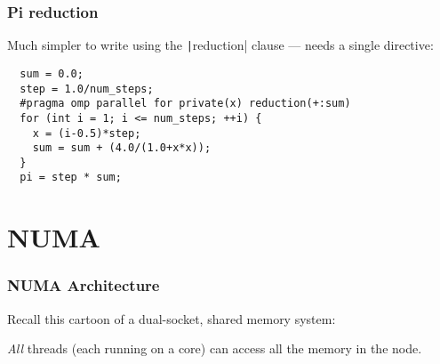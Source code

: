 \documentclass{beamer}
\begin{document}
\begin{frame}[fragile]
\frametitle{Pi reduction}
Much simpler to write using the \texttt|reduction| clause ---  needs a single directive:
\begin{verbatim}
  sum = 0.0;
  step = 1.0/num_steps;
  #pragma omp parallel for private(x) reduction(+:sum)
  for (int i = 1; i <= num_steps; ++i) {
    x = (i-0.5)*step;
    sum = sum + (4.0/(1.0+x*x));
  }
  pi = step * sum;
\end{verbatim}

\end{frame}


\section{NUMA}
\begin{frame}
\frametitle{NUMA Architecture}

Recall this cartoon of a dual-socket, shared memory system:
\begin{center}
\end{center}

\emph{All} threads (each running on a core) can access all the memory in the node.

\end{frame}
\end{document}
